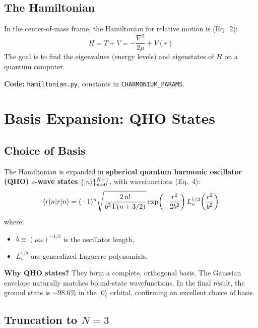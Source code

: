 \documentclass[11pt,a4paper]{article}
\begin{document}
\subsection{The Hamiltonian}

In the center-of-mass frame, the Hamiltonian for relative motion is (Eq.~2):
\begin{equation}
  H = T + V = -\frac{\nabla^2}{2\mu} + V(r)
  \label{eq:hamiltonian}
\end{equation}
The goal is to find the eigenvalues (energy levels) and eigenstates of $H$ on a quantum computer.

\vspace{0.3em}
\noindent\textbf{Code:} \texttt{hamiltonian.py}, constants in \texttt{CHARMONIUM\_PARAMS}.


\section{Basis Expansion: QHO States}

\subsection{Choice of Basis}

The Hamiltonian is expanded in \textbf{spherical quantum harmonic oscillator (QHO) $s$-wave states} $\{\ket{n}\}_{n=0}^{N-1}$, with wavefunctions (Eq.~4):
\begin{equation}
  \braket{r|n} = (-1)^n \sqrt{\frac{2\, n!}{b^3\, \Gamma(n+3/2)}}
    \exp\!\left(-\frac{r^2}{2b^2}\right)
    L_n^{1/2}\!\left(\frac{r^2}{b^2}\right)
  \label{eq:qho_wf}
\end{equation}
where:
\begin{itemize}[nosep]
  \item $b \equiv (\mu\omega)^{-1/2}$ is the oscillator length,
  \item $L_n^{1/2}$ are generalized Laguerre polynomials.
\end{itemize}

\textbf{Why QHO states?} They form a complete, orthogonal basis. The Gaussian envelope naturally matches bound-state wavefunctions. In the final result, the ground state is $\sim 98.6\%$ in the $\ket{0}$ orbital, confirming an excellent choice of basis.

\subsection{Truncation to $N=3$}
\end{document}
